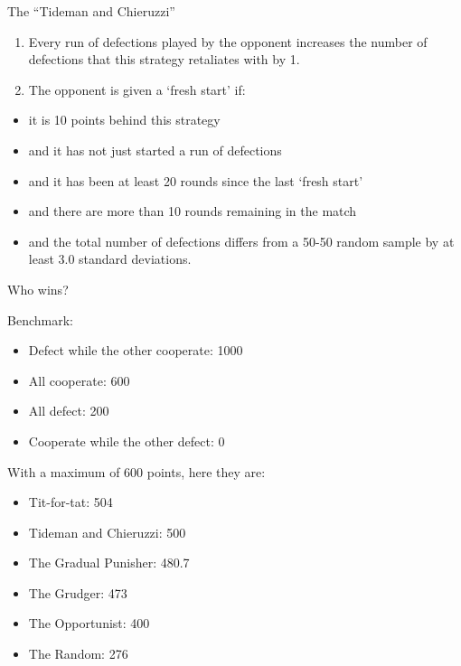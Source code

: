 \begin{frame}{}
\protect\hypertarget{section-42}{}

The ``Tideman and Chieruzzi''

\begin{enumerate}
\item
  Every run of defections played by the opponent increases the number of
  defections that this strategy retaliates with by 1.
\item
  The opponent is given a `fresh start' if:
\end{enumerate}

\begin{itemize}
\tightlist
\item
  it is 10 points behind this strategy
\item
  and it has not just started a run of defections
\item
  and it has been at least 20 rounds since the last `fresh start'
\item
  and there are more than 10 rounds remaining in the match
\item
  and the total number of defections differs from a 50-50 random sample
  by at least 3.0 standard deviations.
\end{itemize}

\end{frame}

\begin{frame}{Who wins?}
\protect\hypertarget{who-wins}{}

Benchmark:

\begin{itemize}
\tightlist
\item
  Defect while the other cooperate: 1000
\item
  All cooperate: 600
\item
  All defect: 200
\item
  Cooperate while the other defect: 0
\end{itemize}

\end{frame}

\begin{frame}{}
\protect\hypertarget{section-43}{}

With a maximum of 600 points, here they are:

\begin{itemize}
\tightlist
\item
  Tit-for-tat: 504
\item
  Tideman and Chieruzzi: 500
\item
  The Gradual Punisher: 480.7
\item
  The Grudger: 473
\item
  The Opportunist: 400
\item
  The Random: 276
\end{itemize}

\end{frame}

